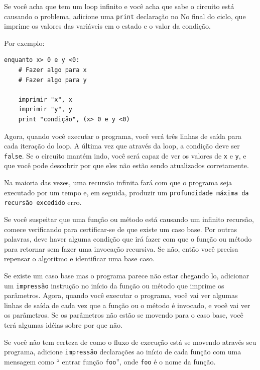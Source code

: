 \documentclass[10pt]{book}
\begin{document}
\begin{v erbatim}
\begin{itemize}
\end{itemize}



Se você acha que tem um loop infinito e você acha que sabe
o circuito está causando o problema, adicione uma {\tt print} declaração no
No final do ciclo, que imprime os valores das variáveis ​​em
o estado e o valor da condição.

Por exemplo:

\begin{verbatim}
enquanto x> 0 e y <0:
    # Fazer algo para x
    # Fazer algo para y

    imprimir "x", x
    imprimir "y", y
    print "condição", (x> 0 e y <0)
\end{verbatim}
%
Agora, quando você executar o programa, você verá três linhas de saída
para cada iteração do loop. A última vez que através da
loop, a condição deve ser {\tt false}. Se o circuito mantém
indo, você será capaz de ver os valores de {\tt x} e {\tt y},
e que você pode descobrir por que eles não estão sendo atualizados corretamente.



Na maioria das vezes, uma recursão infinita fará com que o programa seja executado
por um tempo e, em seguida, produzir um {\tt profundidade máxima da recursão excedido}
erro.

Se você suspeitar que uma função ou método está causando um infinito
recursão, comece verificando para certificar-se de que existe um caso base.
Por outras palavras, deve haver alguma condição que irá fazer com que o
função ou método para retornar sem fazer uma invocação recursiva.
Se não, então você precisa repensar o algoritmo e identificar uma base
caso.

Se existe um caso base mas o programa parece não estar chegando
lo, adicionar um {\tt impressão} instrução no início da função ou método
que imprime os parâmetros. Agora, quando você executar o programa, você vai ver
algumas linhas de saída de cada vez que a função ou o método é invocado,
e você vai ver os parâmetros. Se os parâmetros não estão se movendo
para o caso base, você terá algumas idéias sobre por que não.



Se você não tem certeza de como o fluxo de execução está se movendo através
seu programa, adicione {\tt impressão} declarações ao início de cada
função com uma mensagem como `` entrar função {\tt foo}'', onde
{\tt foo} é o nome da função.


\end{v erbatim}
\end{document}
